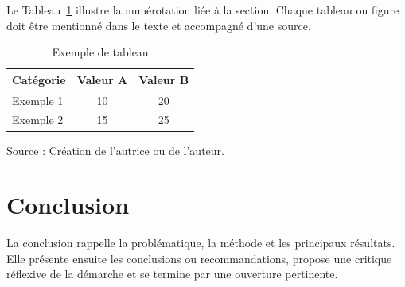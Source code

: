 Le Tableau~\ref{tab:exemple} illustre la numérotation liée à la section. Chaque tableau ou figure doit être mentionné dans le texte et accompagné d'une source.

\begin{table}[H]
  \centering
  \caption{Exemple de tableau}
  \label{tab:exemple}
  \begin{tabular}{lcc}
    \hline
    Catégorie & Valeur A & Valeur B \\
    \hline
    Exemple 1 & 10 & 20 \\
    Exemple 2 & 15 & 25 \\
    \hline
  \end{tabular}
\end{table}

{\fontsize{10}{12}\selectfont\raggedright Source : Création de l'autrice ou de l'auteur.\par}

\section{Conclusion}

La conclusion rappelle la problématique, la méthode et les principaux résultats. Elle présente ensuite les conclusions ou recommandations, propose une critique réflexive de la démarche et se termine par une ouverture pertinente.
